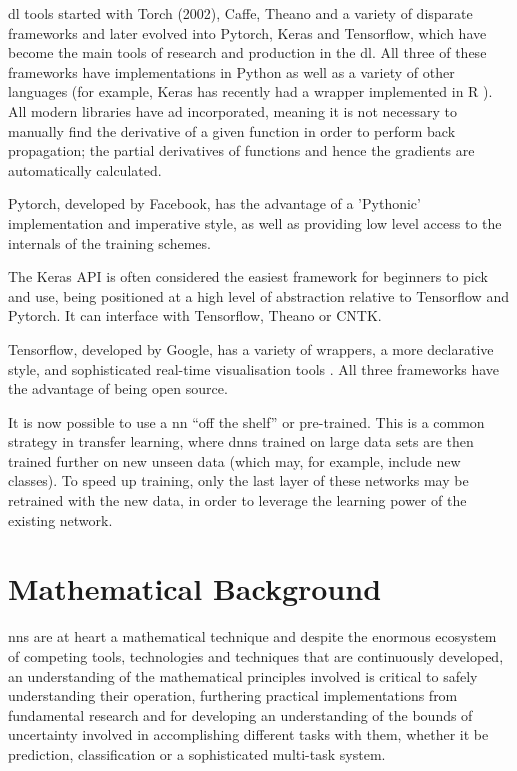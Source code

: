 \gls{dl} tools started with Torch (2002), Caffe, Theano and a variety of disparate frameworks and later evolved into Pytorch, Keras and Tensorflow, which have become the main tools of research and production in the \gls{dl}. All three of these frameworks have implementations in Python as well as a variety of other languages (for example, Keras has recently had a wrapper implemented in R \cite{keras_r}). All modern libraries have \gls{ad} incorporated, meaning it is not necessary to manually find the derivative of a given function in order to perform back propagation; the partial derivatives of functions and hence the gradients are automatically calculated.  \bigskip

Pytorch, developed by Facebook, has the advantage of a 'Pythonic' implementation and imperative style, as well as providing low level access to the internals of the training schemes.
\bigskip

The Keras API is often considered the easiest framework for beginners to pick and use, being positioned at a high level of abstraction relative to Tensorflow and Pytorch. It can interface with Tensorflow, Theano or CNTK.  
\bigskip

Tensorflow, developed by Google, has a variety of wrappers, a more declarative style, and sophisticated real-time visualisation tools \cite{tale_dl}. All three frameworks have the advantage of being open source. 
\bigskip

It is now possible to use a \gls{nn} \enquote{off the shelf} or pre-trained. This is a common strategy in transfer learning, where \gls{dnn}s trained on large data sets are then trained further on new unseen data (which may, for example, include new classes). To speed up training, only the last layer of these networks may be retrained with the new data, in order to leverage the learning power of the existing network. 
\bigskip

\section*{Mathematical Background}


\gls{nn}s are at heart a mathematical technique and despite the enormous ecosystem of competing tools, technologies and techniques that are continuously developed, an understanding of the mathematical principles involved  is critical to safely understanding their operation, furthering practical implementations from fundamental research and for developing an understanding of the bounds of uncertainty involved in accomplishing different tasks with them, whether it be prediction, classification or a sophisticated multi-task system.


